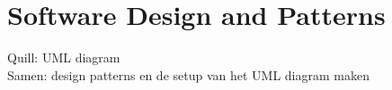 \chapter{Software Design and Patterns}
Quill: UML diagram\\
Samen: design patterns en de setup van het UML diagram maken
